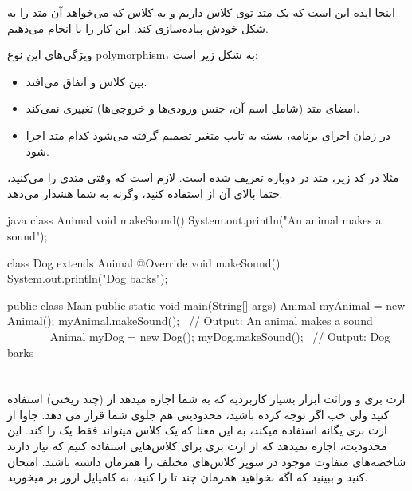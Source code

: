 اینجا ایده این است که یک متد توی کلاس  داریم و یه کلاس
 که می‌خواهد آن متد را به شکل خودش پیاده‌سازی کند. این کار را با
 انجام می‌دهیم.

ویژگی‌های این نوع polymorphism، به شکل زیر است:

\begin{itemize}
\tightlist
\item
  بین کلاس  و  اتفاق می‌افتد.
\item
  امضای متد (شامل اسم آن، جنس ورودی‌ها و خروجی‌ها) تغییری نمی‌کند.
\item
  در زمان اجرای برنامه‌، بسته به تایپ متغیر تصمیم گرفته می‌شود کدام متد
  اجرا شود.
\end{itemize}

مثلا در کد زیر، متد  در  دوباره
تعریف شده است. لازم است که وقتی متدی را  می‌کنید، حتما بالای
آن از  استفاده کنید، وگرنه  به شما
هشدار می‌دهد.

\begin{codebox}{java}
class Animal {
    void makeSound() {  
        System.out.println("An animal makes a sound");
    }  
}  
  
class Dog extends Animal {
    @Override
    void makeSound() {  
        System.out.println("Dog barks");
    }  
}  
  
public class Main {
    public static void main(String[] args) {  
        Animal myAnimal = new Animal();
        myAnimal.makeSound();  // Output: An animal makes a sound
        
        Animal myDog = new Dog();
        myDog.makeSound();  // Output: Dog barks    }  
}
\end{codebox}

\section{}

ارث‌ بری و وراثت ابزار بسیار کاربردیه که به شما اجازه میدهد از
 (چند ریختی) استفاده کنید ولی خب اگر توجه کرده باشید،
محدودیتی هم جلوی شما قرار می دهد. جاوا از ارث بری یگانه
 استفاده میکند، به این معنا که یک کلاس میتواند
فقط یک  را  کند. این محدودیت، اجازه نمیدهد که
از ارث بری برای کلاس‌هایی استفاده کنیم که نیاز دارند شاخصه‌های متفاوت
موجود در سوپر کلاس‌های مختلف را همزمان داشته باشند. امتحان کنید و ببینید
که اگه بخواهید همزمان چند تا  را  کنید، به
کامپایل ارور بر میخورید.

